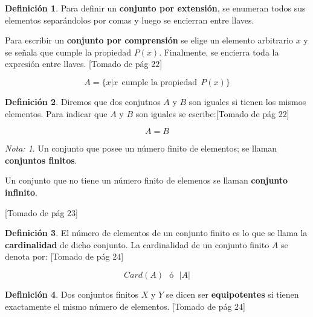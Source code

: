 \documentclass[
]{book}
\theoremstyle{definition}
\newtheorem{definition}{Definición}[chapter]
\theoremstyle{definition}
\theoremstyle{definition}
\theoremstyle{definition}
\theoremstyle{remark}
\newtheorem*{remark}{Nota:}
\begin{document}
\begin{definition}
\protect\hypertarget{def:unnamed-chunk-20}{}{\label{def:unnamed-chunk-20} }Para definir un \textbf{conjunto por extensión}, se enumeran todos sus elementos separándolos por comas y luego se encierran entre llaves.

Para escribir un \textbf{conjunto por comprensión} se elige un elemento arbitrario \(x\) y se señala que cumple la propiedad \(P(x)\). Finalmente, se encierra toda la expresión entre llaves. {[}Tomado de \citep{zill2012algebra} pág \(22\){]}
\end{definition}

\[
A=\{ x | x \ \ \text{cumple la propiedad} \ \ P(x)   \}
\]

\begin{definition}
\protect\hypertarget{def:unnamed-chunk-21}{}{\label{def:unnamed-chunk-21} }Diremos que dos conjutnos \(A\) y \(B\) son iguales si tienen los mismos elementos. Para indicar que \(A\) y \(B\) son iguales se escribe:{[}Tomado de \citep{zill2012algebra} pág \(22\){]}
\end{definition}

\[
A=B
\]

\begin{remark}
\iffalse{} {Nota:} \fi{}Un conjunto que posee un número finito de elementos; se llaman \textbf{conjuntos finitos}.

Un conjunto que no tiene un número finito de elemenos se llaman \textbf{conjunto infinito}.

{[}Tomado de \citep{zill2012algebra} pág \(23\){]}
\end{remark}

\begin{definition}
\protect\hypertarget{def:unnamed-chunk-23}{}{\label{def:unnamed-chunk-23} }El número de elementos de un conjunto finito es lo que se llama la \textbf{cardinalidad} de dicho conjunto. La cardinalidad de un conjunto finito \(A\) se denota por: {[}Tomado de \citep{zill2012algebra} pág \(24\){]}
\end{definition}

\[
Card(A) \ \ \ \text{ó}  \ \ \ |A|
\]

\begin{definition}
\protect\hypertarget{def:unnamed-chunk-24}{}{\label{def:unnamed-chunk-24} }Dos conjuntos finitos \(X\) y \(Y\) se dicen ser \textbf{equipotentes} si tienen exactamente el mismo número de elementos. {[}Tomado de \citep{zill2012algebra} pág \(24\){]}
\end{definition}
\end{document}
